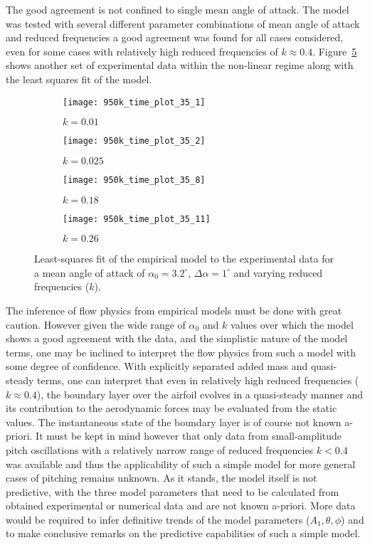 The good agreement is not confined to single mean angle of attack. The model was tested with several different parameter combinations of mean angle of attack and reduced frequencies a good agreement was found for all cases considered, even for some cases with relatively high reduced frequencies of $k\approx0.4$. Figure~\ref{fig:model_fits2} shows another set of experimental data within the non-linear regime along with the least squares fit of the model.
\begin{figure}[h]
	\centering
	\begin{subfigure}[b]{0.45\textwidth}
		\centering
		\texttt{[image: 950k\_time\_plot\_35\_1]}
		\caption{$k=0.01$}
		\label{fig:k_01_2}
	\end{subfigure}
	\begin{subfigure}[b]{0.45\textwidth}
		\centering
		\texttt{[image: 950k\_time\_plot\_35\_2]}
		\caption{$k=0.025$}
		\label{fig:k_025_2}
	\end{subfigure}
	\begin{subfigure}[b]{0.45\textwidth}
		\centering
		\texttt{[image: 950k\_time\_plot\_35\_8]}
		\caption{$k=0.18$}
		\label{fig:k_18_2}
	\end{subfigure}
	\begin{subfigure}[b]{0.45\textwidth}
		\centering
		\texttt{[image: 950k\_time\_plot\_35\_11]}
		\caption{$k=0.26$}
		\label{fig:k_2_2}
	\end{subfigure}	
	\caption{Least-squares fit of the empirical model to the experimental data for a mean angle of attack of $\alpha_{0}=3.2^{\circ}$, $\Delta\alpha=1^{\circ}$ and varying reduced frequencies ($k$).}
	\label{fig:model_fits2}
\end{figure}
The inference of flow physics from empirical models must be done with great caution. However given the wide range of $\alpha_{0}$ and $k$ values over which the model shows a good agreement with the data, and the simplistic nature of the model terms, one may be inclined to interpret the flow physics from such a model with some degree of confidence. With explicitly separated added mass and quasi-steady terms, one can interpret that even in relatively high reduced frequencies ($k\approx0.4$), the boundary layer over the airfoil evolves in a quasi-steady manner and its contribution to the aerodynamic forces may be evaluated from the static values. The instantaneous state of the boundary layer is of course not known a-priori. It must be kept in mind however that only data from small-amplitude pitch oscillations with a relatively narrow range of reduced frequencies $k<0.4$ was available and thus the applicability of such a simple model for more general cases of pitching remains unknown. As it stands, the model itself is not predictive, with the three model parameters that need to be calculated from obtained experimental or numerical data and are not known a-priori. More data would be required to infer definitive trends of the model parameters ($A_{1},\theta,\phi$) and to make conclusive remarks on the predictive capabilities of such a simple model.

